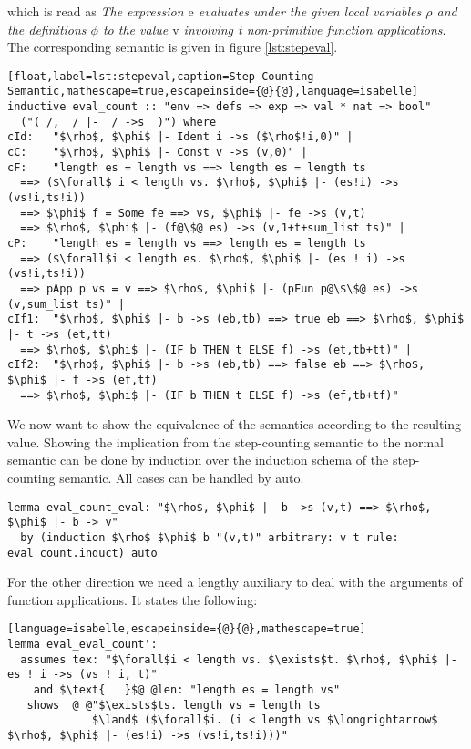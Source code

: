 which is read as \textit{The expression $\text{e}$ evaluates under the given local variables $\rho$ and the definitions $\phi$ to the value $\text{v}$ involving t non-primitive function applications}. The corresponding semantic is given in figure \ref{lst:stepeval}.
\begin{lstlisting}[float,label=lst:stepeval,caption=Step-Counting Semantic,mathescape=true,escapeinside={@}{@},language=isabelle]
inductive eval_count :: "env => defs => exp => val * nat => bool"
  ("(_/, _/ |- _/ ->s _)") where
cId:   "$\rho$, $\phi$ |- Ident i ->s ($\rho$!i,0)" |
cC:    "$\rho$, $\phi$ |- Const v ->s (v,0)" |
cF:    "length es = length vs ==> length es = length ts
  ==> ($\forall$ i < length vs. $\rho$, $\phi$ |- (es!i) ->s (vs!i,ts!i))
  ==> $\phi$ f = Some fe ==> vs, $\phi$ |- fe ->s (v,t)
  ==> $\rho$, $\phi$ |- (f@\$@ es) ->s (v,1+t+sum_list ts)" |
cP:    "length es = length vs ==> length es = length ts
  ==> ($\forall$i < length es. $\rho$, $\phi$ |- (es ! i) ->s (vs!i,ts!i))
  ==> pApp p vs = v ==> $\rho$, $\phi$ |- (pFun p@\$\$@ es) ->s (v,sum_list ts)" |
cIf1:  "$\rho$, $\phi$ |- b ->s (eb,tb) ==> true eb ==> $\rho$, $\phi$ |- t ->s (et,tt)
  ==> $\rho$, $\phi$ |- (IF b THEN t ELSE f) ->s (et,tb+tt)" |
cIf2:  "$\rho$, $\phi$ |- b ->s (eb,tb) ==> false eb ==> $\rho$, $\phi$ |- f ->s (ef,tf)
  ==> $\rho$, $\phi$ |- (IF b THEN t ELSE f) ->s (ef,tb+tf)"
\end{lstlisting}

We now want to show the equivalence of the semantics according to the resulting value.
Showing the implication from the step-counting semantic to the normal semantic can be done by induction over the induction schema of the step-counting semantic.
All cases can be handled by auto.
\begin{lstlisting}[language=isabelle,mathescape=true]
  lemma eval_count_eval: "$\rho$, $\phi$ |- b ->s (v,t) ==> $\rho$, $\phi$ |- b -> v"
  by (induction $\rho$ $\phi$ b "(v,t)" arbitrary: v t rule: eval_count.induct) auto
\end{lstlisting}

For the other direction we need a lengthy auxiliary to deal with the arguments of function applications.
It states the following:
\begin{lstlisting}[language=isabelle,escapeinside={@}{@},mathescape=true]
lemma eval_eval_count':
  assumes tex: "$\forall$i < length vs. $\exists$t. $\rho$, $\phi$ |- es ! i ->s (vs ! i, t)"
    and $\text{   }$@ @len: "length es = length vs"
   shows  @ @"$\exists$ts. length vs = length ts
             $\land$ ($\forall$i. (i < length vs $\longrightarrow$ $\rho$, $\phi$ |- (es!i) ->s (vs!i,ts!i)))"
\end{lstlisting}

